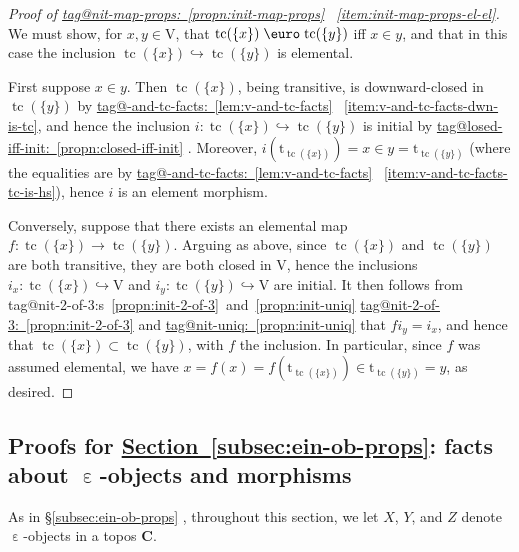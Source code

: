 \documentclass{amsart}
\makeatletter
\newcommand\alttext{\texorpdfstring}
\newcommand\bC{\mathbf{C}}
\newcommand\Ein{\mathrel{\text{\textup{\euro}}}}
\newcommand\ein{\mathrel{\varepsilon}}
\newcommand\hto{\hookrightarrow}
\newcommand\rt{\mathrm{t}}
\newcommand\rV{\mathrm{V}}
\newcommand\set[2][]{#1\{ #2 #1\}}
\newcommand\tc{\operatorname{tc}}
\newcommand\unein{{\ein}}
\newcommand\tagword[1]{\csname tag@#1\endcsname}
\def\label@tag#1:#2\@nil{#1}
\newcommand\labeltag[1]{\label@tag#1:\@nil}
\newcommand\jref[1]{%
  \texorpdfstring%
    {\hyperref[#1]{\tagword{\labeltag{#1}}~\ref*{#1}}}%
    {\tagword{\labeltag{#1}}~\ref*{#1}}%
}
\newcommand\jrefs[2]{%
  \ifthenelse{\equal{\labeltag{#1}}{\labeltag{#2}}}%
  {%
    \texorpdfstring%
      {\tagword{\labeltag{#1}}s~\ref{#1}~and~\ref{#2}}%
      {\tagword{\labeltag{#1}}s~\ref*{#1}~and~\ref*{#2}}%
  }{\jref{#1} and \jref{#2}}%
}
\newcommand\prerefpost[3]{%
  \texorpdfstring%
    {\hyperref[#2]{#1\ref*{#2}#3}}%
    {#1\ref*{#2}#3}%
}
\newcommand\sref[1]{\prerefpost{\S}{#1}{}}
\theoremstyle{definition}
\theoremstyle{remark}
\theoremstyle{plainwithref}
\newenvironment{settybox}{\begin{tcolorbox}[colback=blue!20,breakable%
    ,enhanced%
    ,sharp corners%
    ,frame hidden%
    ,boxsep=0pt
    ,left=5pt,right=5pt,top=5pt,bottom=5pt
    ,enlarge left by=-5pt,width=\linewidth+10pt
    ,enlarge top by=5pt,enlarge bottom by=5pt
    ,before skip balanced=0pt,after skip balanced=0pt
    ]}{\end{tcolorbox}}
\makeatother
\begin{document}
\begin{settybox}
  \begin{proof}[Proof of \jref{propn:init-map-props}~\ref{item:init-map-props-el-el}] \label{proof:init-map-props-el-el}
    We must show, for \( x, y \in \rV \), that \( \tc(\set{x}) \Ein \tc(\set{y}) \) iff \( x \in y \), and that in this case the inclusion \( \tc(\set{x}) \hto \tc(\set{y}) \) is elemental.

    First suppose \( x \in y \).
    Then \( \tc(\set{x}) \), being transitive, is downward-closed in \( \tc(\set{y}) \) by \jref{lem:v-and-tc-facts}~\ref{item:v-and-tc-facts-dwn-is-tc}, and hence the inclusion \( i \colon \tc(\set{x}) \hto \tc(\set{y}) \) is initial by \jref{propn:closed-iff-init}.
    Moreover, \( i(\rt_{\tc(\set{x})}) = x \in y = \rt_{\tc(\set{y})} \) (where the equalities are by \jref{lem:v-and-tc-facts}~\ref{item:v-and-tc-facts-tc-is-hs}), hence \( i \) is an element morphism.

    Conversely, suppose that there exists an elemental map \( f \colon \tc(\set{x}) \to \tc(\set{y}) \).
    Arguing as above, since \( \tc(\set{x}) \) and \( \tc(\set{y}) \) are both transitive, they are both closed in \( \rV \), hence the inclusions \( i_x \colon \tc(\set{x}) \hto \rV \) and \( i_y \colon \tc(\set{y}) \hto \rV \) are initial.
    It then follows from \jrefs{propn:init-2-of-3}{propn:init-uniq} that \( f i_y = i_x \), and hence that \( \tc(\set{x}) \subset \tc(\set{y}) \), with \( f \) the inclusion.
    In particular, since \( f \) was assumed elemental, we have \( x = f(x) = f(\rt_{\tc(\set{x})}) \in \rt_{\tc(\set{y})} = y \), as desired.
  \end{proof}
\end{settybox}

\subsection{Proofs for \alttext{\hyperref[subsec:ein-ob-props]{Section~\ref*{subsec:ein-ob-props}}}{Section~\ref*{subsec:ein-ob-props}}: facts about \alttext{\( \unein \)}{ε}-objects and morphisms} \label{subsec:ein-ob-props-proofs}
As in \sref{subsec:ein-ob-props}, throughout this section, we let \( X \), \( Y \), and \( Z \) denote \( \unein \)-objects in a topos \( \bC \).
\end{document}

